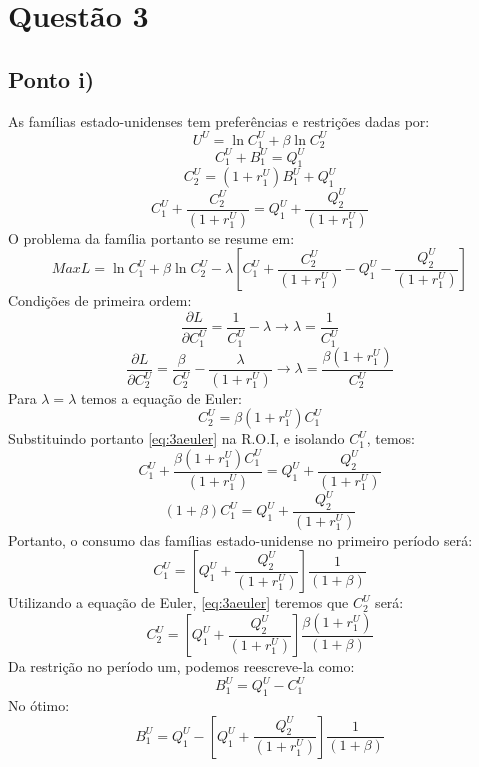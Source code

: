 \documentclass{article}
\begin{document}
\section*{Questão 3}
\subsection*{Ponto i)}
As famílias estado-unidenses tem preferências e restrições dadas por:
    $$U^{U}=\ln C_1^U + \beta\ln C_2^U$$
   $$C_1^{U}+B_1^{U}=Q_1^{U}$$
   $$C_2^{U}=(1+r_1^U)B_1^{U}+Q_1^{U}$$
   $$C_1^{U}+\frac{C_2^{U}}{(1+r_1^U)}=Q_1^{U}+\frac{Q_2^{U}}{(1+r_1^U)}$$
O problema da família portanto se resume em:
\begin{equation}
    Max L = \ln C_1^U + \beta\ln C_2^U-\lambda\left[C_1^{U}+\frac{C_2^{U}}{(1+r_1^U)}-Q_1^{U}-\frac{Q_2^{U}}{(1+r_1^U)}\right]
\end{equation}
Condições de primeira ordem:
\begin{equation}
    \frac{\partial L}{\partial C_1^U} = \frac{1}{C_1^U}-\lambda \to \lambda=\frac{1}{C_1^U}
\end{equation}
\begin{equation}
    \frac{\partial L}{\partial C_2^U} = \frac{\beta}{C_2^U}-\frac{\lambda}{(1+r_1^U)} \to \lambda=\frac{\beta(1+r_1^U)}{C_2^U}
\end{equation}
Para $\lambda=\lambda$ temos a equação de Euler:
\begin{equation}\label{eq:3aeuler}
    C_2^U=\beta(1+r_1^U)C_1^U
\end{equation}
Substituindo portanto \eqref{eq:3aeuler} na R.O.I, e isolando $C_1^U$, temos:
\begin{equation}
    C_1^{U}+\frac{\beta(1+r_1^U)C_1^U}{(1+r_1^U)}=Q_1^{U}+\frac{Q_2^{U}}{(1+r_1^U)}
\end{equation}
\begin{equation}
    (1+\beta)C_1^{U}=Q_1^{U}+\frac{Q_2^{U}}{(1+r_1^U)}
\end{equation}
Portanto, o consumo das famílias estado-unidense no primeiro período será:
\begin{equation}
    C_1^{U}=\left[Q_1^{U}+\frac{Q_2^{U}}{(1+r_1^U)}\right]\frac{1}{(1+\beta)}
\end{equation}
Utilizando a equação de Euler, \eqref{eq:3aeuler} teremos que $C_2^U$ será:
\begin{equation}
    C_2^{U}=\left[Q_1^{U}+\frac{Q_2^{U}}{(1+r_1^U)}\right]\frac{\beta(1+r_1^U)}{(1+\beta)}
\end{equation}
Da restrição no período um, podemos reescreve-la como:
\begin{equation}
    B_1^{U}=Q_1^{U}-C_1^{U}
\end{equation}
No ótimo:
\begin{equation}
    B_1^{U}=Q_1^{U}-\left[Q_1^{U}+\frac{Q_2^{U}}{(1+r_1^U)}\right]\frac{1}{(1+\beta)}
\end{equation}
\end{document}
